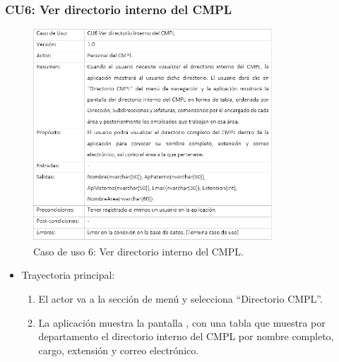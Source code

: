 \newpage
			
		\subsubsection{CU6: Ver directorio interno del CMPL}
			\begin{figure}[htbp!]
				\centering
					\includegraphics[width=0.8\textwidth]{images/CU/CU6}
					\caption{Caso de uso 6: Ver directorio interno del CMPL.}
				\label{Tabla}
			\end{figure}
			
			\begin{itemize}
				\item Trayectoria principal:
					\begin{enumerate}
						\item El actor va a la sección de menú y selecciona ``Directorio CMPL''.
						\item La aplicación muestra la pantalla , con una tabla que muestra por departamento el directorio interno del CMPL por nombre completo, cargo, extensión y correo electrónico.
					\end{enumerate}
			\end{itemize}
			
\newpage
			
